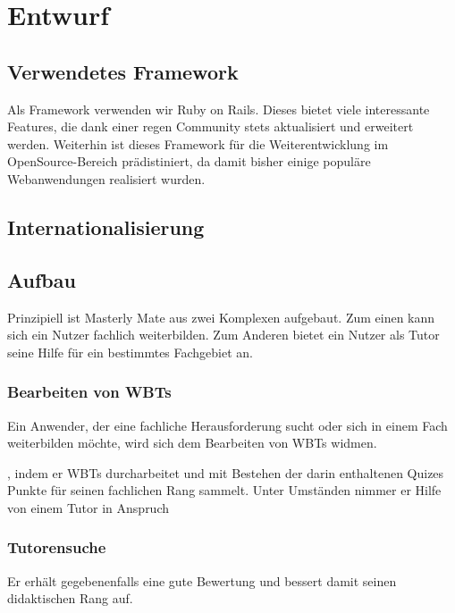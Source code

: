 \chapter{Entwurf}\label{ref:chaptScript}
\section{Verwendetes Framework}
Als Framework verwenden wir Ruby on Rails. Dieses bietet viele interessante
Features, die dank einer regen Community stets aktualisiert und erweitert
werden. Weiterhin ist dieses Framework für die Weiterentwicklung im
OpenSource-Bereich prädistiniert, da damit bisher einige populäre Webanwendungen
realisiert wurden.

\section{Internationalisierung}\label{ref:internationalisierung}

\section{Aufbau}
Prinzipiell ist Masterly Mate aus zwei Komplexen aufgebaut. Zum einen kann sich
ein Nutzer fachlich weiterbilden. Zum Anderen bietet ein Nutzer als Tutor seine
Hilfe für ein bestimmtes Fachgebiet an.

\subsection{Bearbeiten von WBTs}
Ein Anwender, der eine fachliche Herausforderung sucht oder sich in einem Fach
weiterbilden möchte, wird sich dem Bearbeiten von WBTs widmen.

\begin{k}
, indem er WBTs durcharbeitet und mit Bestehen
der darin enthaltenen Quizes Punkte für seinen fachlichen Rang sammelt. Unter
Umständen nimmer er Hilfe von einem Tutor in Anspruch
\end{k}
\subsection{Tutorensuche}
\begin{k}
Er erhält gegebenenfalls eine gute Bewertung und
bessert damit seinen didaktischen Rang auf.
\end{k}